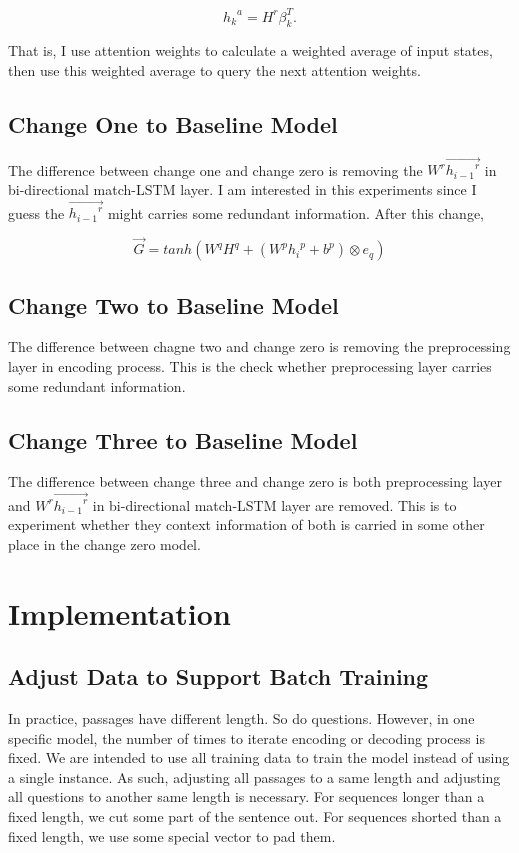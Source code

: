 \documentclass[modernstyle,12pt]{sjsuthesis}
\theoremstyle{definition}
\begin{document}
$${h_k}^a = H^r\beta _{k}^T.$$

That is, I use attention weights to calculate a weighted average of input states, then use this weighted average to query the next attention weights.

\section{Change One to Baseline Model}

The difference between change one and change zero is removing the $W^r\overrightarrow{{h_{i-1}}^r}$ in bi-directional match-LSTM layer. I am interested in this experiments since I guess the $\overrightarrow{{h_{i-1}}^r}$ might carries some redundant information. After this change,


$$\overrightarrow{G} = tanh(W^qH^q + (W^p{h_i}^p + b^p) \otimes e_q)$$


\section{Change Two to Baseline Model}

The difference between chagne two and change zero is removing the preprocessing layer in encoding process. This is the check whether preprocessing layer carries some redundant information.

\section{Change Three to Baseline Model}

The difference between change three and change zero is both preprocessing layer and $W^r\overrightarrow{{h_{i-1}}^r}$ in bi-directional match-LSTM layer are removed. This is to experiment whether they context information of both is carried in some other place in the change zero model.

\chapter{Implementation}

\section{Adjust Data to Support Batch Training}\label{sect:padding}

In practice, passages have different length. So do questions. However, in one specific model, the number of times to iterate encoding or decoding process is fixed. We are intended to use all training data to train the model instead of using a single instance. As such, adjusting all passages to a same length and adjusting all questions to another same length is necessary. For sequences longer than a fixed length, we cut some part of the sentence out. For sequences shorted than a fixed length, we use some special vector to pad them.
\end{document}
